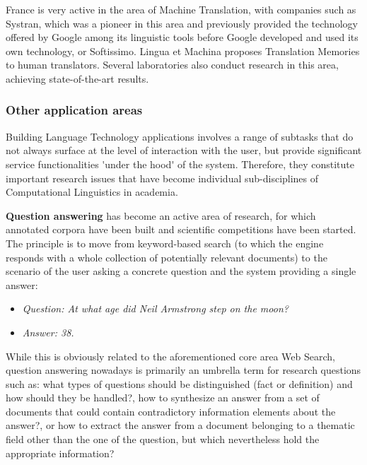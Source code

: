 \begin{multicols}{2}
France is very active in the area of Machine Translation, with
companies such as Systran, which was a pioneer in this area and
previously provided the technology offered by Google among its
linguistic tools before Google developed and used its own technology,
or Softissimo. Lingua et Machina proposes Translation Memories to
human translators. Several laboratories also conduct research in this
area, achieving state-of-the-art results.

\subsubsection{Other application areas}

Building Language Technology applications involves a range of subtasks
that do not always surface at the level of interaction with the user,
but provide significant service functionalities {\mbox '}under the hood{\mbox '} of
the system. Therefore, they constitute important research issues that
have become individual sub-disciplines of Computational Linguistics in
academia.

{\bf Question answering} has become an active area of research, for
which annotated corpora have been built and scientific competitions
have been started. The principle is to move from keyword-based search
(to which the engine responds with a whole collection of potentially
relevant documents) to the scenario of the user asking a concrete
question and the system providing a single answer:

\begin{itemize}
\item[] \textit{Question: At what age did Neil Armstrong step on the moon?}
\item[] \textit{Answer: 38.}
\end{itemize}

While this is obviously related to the aforementioned core area
Web Search, question answering nowadays is primarily an umbrella term
for research questions such as: what types of questions should be
distinguished (fact or definition) and how should they be handled?, how
to synthesize an answer from a set of documents that could contain
contradictory information elements about the answer?, or how to extract
the answer from a document belonging to a thematic field other than
the one of the question, but which nevertheless hold the appropriate
information?


\end{multicols}

